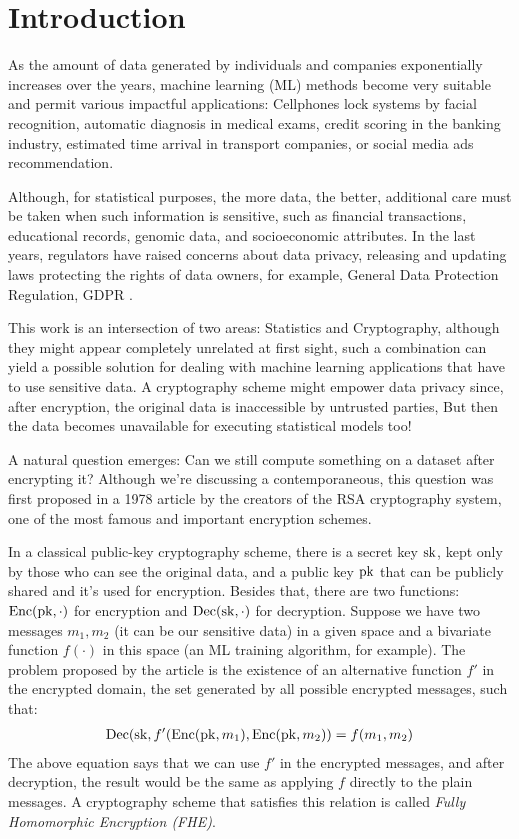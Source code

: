 \chapter{Introduction}

As the amount of data generated by individuals and companies exponentially increases over the years, machine learning (ML) methods become very suitable and permit various impactful applications: Cellphones lock systems by facial recognition, automatic diagnosis in medical exams, credit scoring in the banking industry, estimated time arrival in transport companies, or social media ads recommendation.

Although, for statistical purposes, the more data, the better, additional care must be taken when such information is sensitive, such as financial transactions, educational records, genomic data, and socioeconomic attributes. In the last years, regulators have raised concerns about data privacy, releasing and updating laws protecting the rights of data owners, for example, General Data Protection Regulation, GDPR \cite{gdpr}.

This work is an intersection of two areas: Statistics and Cryptography, although they might appear completely unrelated at first sight, such a combination can yield a possible solution for dealing with machine learning applications that have to use sensitive data. A cryptography scheme might empower data privacy since, after encryption, the original data is inaccessible by untrusted parties, But then the data becomes unavailable for executing statistical models too!

A natural question emerges: Can we still compute something on a dataset after encrypting it?  Although we're discussing a contemporaneous, this question was first proposed in a 1978 article \cite{Rivest1978} by the creators of the RSA cryptography system, one of the most famous and important encryption schemes.

In a classical public-key cryptography scheme, there is a secret key $\operatorname{sk}$, kept only by those who can see the original data, and a public key $\operatorname{pk}$ that can be publicly shared and it's used for encryption. Besides that, there are two functions: $\operatorname{Enc}(\operatorname{pk},\cdot)$ for encryption and $\operatorname{Dec}(\operatorname{sk},\cdot)$ for decryption. Suppose we have two messages $m_1,m_2$ (it can be our sensitive data) in a given space and a bivariate function $f(\cdot)$ in this space (an ML training algorithm, for example). The problem proposed by the article is the existence of an alternative function $f'$ in the encrypted domain, the set generated by all possible encrypted messages, such that:
\begin{align*}\operatorname{Dec}(\operatorname{sk},f'(\operatorname{Enc}(\operatorname{pk},m_1),\operatorname{Enc}(\operatorname{pk},m_2))=f(m_1,m_2)
\end{align*}
The above equation says that we can use $f'$ in the encrypted messages, and after decryption, the result would be the same as applying $f$ directly to the plain messages. A cryptography scheme that satisfies this relation is called \textit{Fully Homomorphic Encryption (FHE)}.

